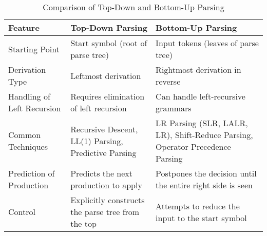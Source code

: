 \begin{table}[ht!]
    \centering
    \renewcommand{\arraystretch}{1.2}
    \begin{tabularx}{\textwidth}{|
        >{\raggedright\arraybackslash}p{}|
        >{\raggedright\arraybackslash}X|
        >{\raggedright\arraybackslash}X|
      }
      \hline
      \textbf{Feature} & \textbf{Top-Down Parsing} & \textbf{Bottom-Up Parsing} \\
      \hline
      Starting Point
        & Start symbol (root of parse tree)
        & Input tokens (leaves of parse tree) \\
      \hline
      Derivation Type
        & Leftmost derivation
        & Rightmost derivation in reverse \\
      \hline
      Handling of Left Recursion
        & Requires elimination of left recursion
        & Can handle left-recursive grammars \\
      \hline
      Common Techniques
        & Recursive Descent, LL(1) Parsing, Predictive Parsing
        & LR Parsing (SLR, LALR, LR), Shift-Reduce Parsing, Operator Precedence Parsing \\
      \hline
      Prediction of Production
        & Predicts the next production to apply
        & Postpones the decision until the entire right side is seen \\
      \hline
      Control
        & Explicitly constructs the parse tree from the top
        & Attempts to reduce the input to the start symbol \\
      \hline
    \end{tabularx}
    \caption{Comparison of Top-Down and Bottom-Up Parsing}
    \label{tab:td-vs-bu}
\end{table}

\pagebreak
